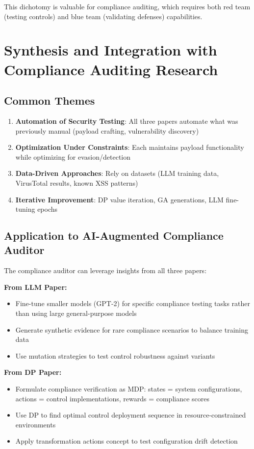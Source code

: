 \documentclass[11pt,conference]{IEEEtran}
\begin{document}
\begin{enumerate}
This dichotomy is valuable for compliance auditing, which requires both red team (testing controls) and blue team (validating defenses) capabilities.

\section{Synthesis and Integration with Compliance Auditing Research}

\subsection{Common Themes}

\begin{enumerate}
    \item \textbf{Automation of Security Testing}: All three papers automate what was previously manual (payload crafting, vulnerability discovery)
    \item \textbf{Optimization Under Constraints}: Each maintains payload functionality while optimizing for evasion/detection
    \item \textbf{Data-Driven Approaches}: Rely on datasets (LLM training data, VirusTotal results, known XSS patterns)
    \item \textbf{Iterative Improvement}: DP value iteration, GA generations, LLM fine-tuning epochs
\end{enumerate}

\subsection{Application to AI-Augmented Compliance Auditor}

The compliance auditor can leverage insights from all three papers:

\textbf{From LLM Paper:}
\begin{itemize}
    \item Fine-tune smaller models (GPT-2) for specific compliance testing tasks rather than using large general-purpose models
    \item Generate synthetic evidence for rare compliance scenarios to balance training data
    \item Use mutation strategies to test control robustness against variants
\end{itemize}

\textbf{From DP Paper:}
\begin{itemize}
    \item Formulate compliance verification as MDP: states = system configurations, actions = control implementations, rewards = compliance scores
    \item Use DP to find optimal control deployment sequence in resource-constrained environments
    \item Apply transformation actions concept to test configuration drift detection
\end{itemize}


\end{enumerate}
\end{document}
